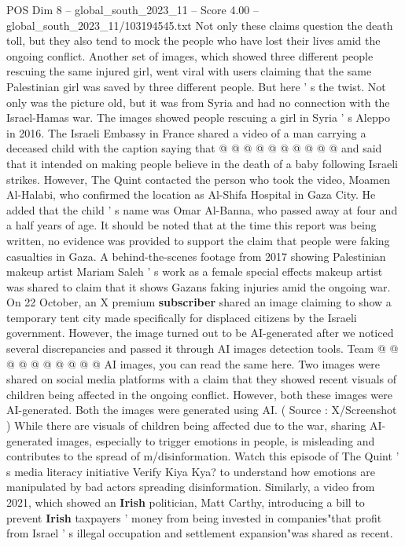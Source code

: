 \begin{textsample}{POS Dim 8 – global\_south\_2023\_11 – Score 4.00 – global\_south\_2023\_11/103194545.txt}
Not only these claims question the death toll, but they also tend to mock the people who have lost their lives amid the ongoing conflict.
Another set of images, which showed three different people rescuing the same injured girl, went viral with users claiming that the same Palestinian girl was saved by three different people.
But here ' s the twist.
Not only was the picture old, but it was from Syria and had no connection with the Israel-Hamas war.
The images showed people rescuing a girl in Syria ' s Aleppo in 2016.
The Israeli Embassy in France shared a video of a man carrying a deceased child with the caption saying that @ @ @ @ @ @ @ @ @ @ and said that it intended on making people believe in the death of a baby following Israeli strikes.
However, The Quint contacted the person who took the video, Moamen Al-Halabi, who confirmed the location as Al-Shifa Hospital in Gaza City.
He added that the child ' s name was Omar Al-Banna, who passed away at four and a half years of age.
It should be noted that at the time this report was being written, no evidence was provided to support the claim that people were faking casualties in Gaza.
A behind-the-scenes footage from 2017 showing Palestinian makeup artist Mariam Saleh ' s work as a female special effects makeup artist was shared to claim that it shows Gazans faking injuries amid the ongoing war.
On 22 October, an X premium \textbf{subscriber} shared an image claiming to show a temporary tent city made specifically for displaced citizens by the Israeli government.
However, the image turned out to be AI-generated after we noticed several discrepancies and passed it through AI images detection tools.
Team @ @ @ @ @ @ @ @ @ @ AI images, you can read the same here.
Two images were shared on social media platforms with a claim that they showed recent visuals of children being affected in the ongoing conflict.
However, both these images were AI-generated.
Both the images were generated using AI. ( Source : X/Screenshot ) While there are visuals of children being affected due to the war, sharing AI-generated images, especially to trigger emotions in people, is misleading and contributes to the spread of m/disinformation.
Watch this episode of The Quint ' s media literacy initiative Verify Kiya Kya? to understand how emotions are manipulated by bad actors spreading disinformation.
Similarly, a video from 2021, which showed an \textbf{Irish} politician, Matt Carthy, introducing a bill to prevent \textbf{Irish} taxpayers ' money from being invested in companies"that profit from Israel ' s illegal occupation and settlement expansion"was shared as recent.

\end{textsample}
